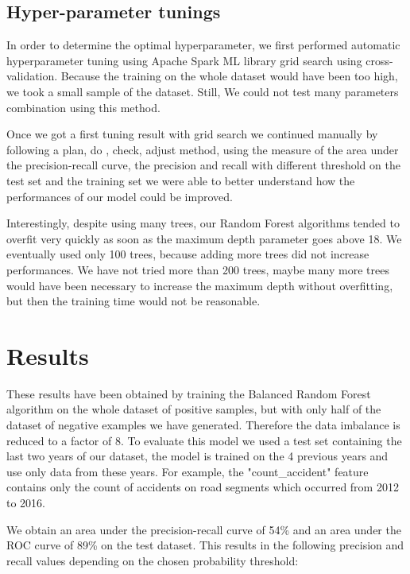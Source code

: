 \documentclass[conference]{IEEEtran}
\begin{document}
\subsection{Hyper-parameter tunings}
In order to determine the optimal hyperparameter, we first performed automatic hyperparameter tuning using Apache Spark ML library grid search using cross-validation.
Because the training on the whole dataset would have been too high, we took a small sample of the dataset.
Still, We could not test many parameters combination using this method.

Once we got a first tuning result with grid search we continued manually by following a plan, do , check, adjust method, using the measure of the area under the precision-recall curve, the precision and recall with different threshold on the test set and the training set we were able to better understand how the performances of our model could be improved.

Interestingly, despite using many trees, our Random Forest algorithms tended to overfit very quickly as soon as the maximum depth parameter goes above 18.
We eventually used only 100 trees, because adding more trees did not increase performances.
We have not tried more than 200 trees, maybe many more trees would have been necessary to increase the maximum depth without overfitting, but then the training time would not be reasonable.

\section{Results}
These results have been obtained by training the Balanced Random Forest algorithm on the whole dataset of positive samples, but with only half of the dataset of negative examples we have generated.
Therefore the data imbalance is reduced to a factor of 8.
To evaluate this model we used a test set containing the last two years of our dataset, the model is trained on the 4 previous years and use only data from these years.
For example, the "count\_accident" feature contains only the count of accidents on road segments which occurred from 2012 to 2016.

We obtain an area under the precision-recall curve of 54\% and an area under the ROC curve of 89\% on the test dataset.
This results in the following precision and recall values depending on the chosen probability threshold:
\end{document}
